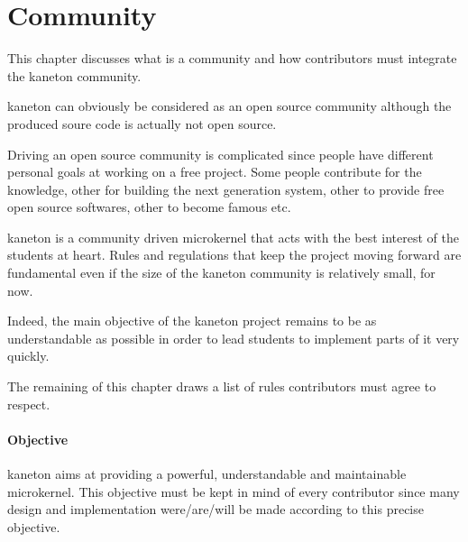 %
%
%
%
%
%

%
%

\chapter{Community}
\label{chapter:community}

This chapter discusses what is a community and how contributors must integrate
the kaneton community.

\newpage

%
%

kaneton can obviously be considered as an open source community although the
produced soure code is actually not open source.

Driving an open source community is complicated since people have different
personal goals at working on a free project. Some people contribute for
the knowledge, other for building the next generation system, other to
provide free open source softwares, other to become famous etc.

kaneton is a community driven microkernel that acts with the best interest of
the students at heart. Rules and regulations that keep the project moving
forward are fundamental even if the size of the kaneton community is
relatively small, for now.

Indeed, the main objective of the kaneton project remains to be as
understandable as possible in order to lead students to implement parts of
it very quickly.

The remaining of this chapter draws a list of rules contributors must agree
to respect.


\subsubsection{Objective}

kaneton aims at providing a powerful, understandable and maintainable
microkernel. This objective must be kept in mind of every contributor
since many design and implementation were/are/will be made according to
this precise objective.

